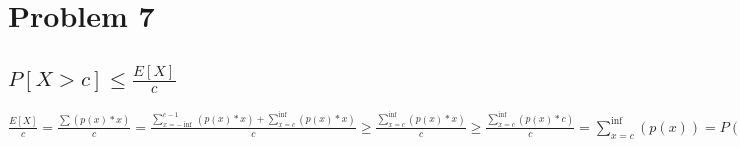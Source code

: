 \section{Problem 7}
\subsection{$P[X>c] \leq \frac{E[X]}{c}$}
$\frac{E[X]}{c} = \frac{\sum (p(x)*x)}{c} = \frac{\sum_{x = -\inf}^{c-1} (p(x)*x) + \sum_{x = c}^{\inf} (p(x)*x)}{c} \ge \frac{\sum_{x = c}^{\inf} (p(x)*x)}{c} \ge \frac{\sum_{x = c}^{\inf} (p(x)*c)}{c} = \sum_{x = c}^{\inf} (p(x)) = P(X \ge c ) \ge P(X > c ) $